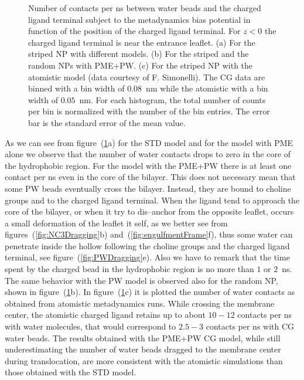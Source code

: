 \begin{figure}[ht!]
{	}%
	\caption{Number of contacts per ns between water beads and the charged ligand terminal subject to the metadynamics bias potential in function of the position of the charged ligand terminal. For $z<0$ the charged ligand terminal is near the entrance leaflet. (a) For the striped \acs{NP} with different models. (b) For the striped and the random \acs{NP}s with \acs{PME}+\acs{PW}. (c) For the striped \acs{NP} with the atomistic model (data courtesy of F. Simonelli). The \ac{CG} data are binned with a bin width of $0.08$~nm while the atomistic with a bin width of $0.05$~nm. For each histogram, the total number of counts per bin is normalized with the number of the bin entries. The error bar is the standard error of the mean value.}%
	\label{fig:WContact}
\end{figure}

As we can see from figure~(\ref{fig:WContact}a) for the \ac{STD} \martini{} model and for the model with \ac{PME} 
alone we observe that the number of water contacts drops to zero in the core of the hydrophobic region. For the 
model with the \ac{PME}+\ac{PW} there is at least one contact per ns even in the core of the bilayer. This does 
not necessary mean that some \ac{PW} beads eventually cross the bilayer. Instead, they are bound to choline groups 
and to the charged ligand terminal. When the ligand tend to approach the core of the bilayer, or when it try to 
dis--anchor from the opposite leaflet, occurs a small deformation of the leaflet it self, as we better see from 
figures~(\ref{fig:NC3Dragging}b) and~(\ref{fig:engulfmentFrame}f), thus some water can penetrate inside the hollow 
following the choline groups and the charged ligand terminal, see figure~(\ref{fig:PWDragging}e). Also we have to 
remark that the time spent by the charged bead in the hydrophobic region is no more than $1$ or $2$~ns. The same 
behavior with the \ac{PW} model is observed also for the random \ac{NP}, shown in figure~(\ref{fig:WContact}b). In 
figure~(\ref{fig:WContact}c) it is plotted the number of water contacts as obtained from atomistic metadynamics 
runs. While crossing the membrane center, the atomistic charged ligand retains up to about $10-12$ contacts per ns 
with water molecules, that would correspond to $2.5-3$ contacts per ns with \martini{} \ac{CG} water beads. The 
results obtained with the \ac{PME}$+$\ac{PW} \ac{CG} model, while still underestimating the number of water beads 
dragged to the membrane center during translocation, are more consistent with the atomistic simulations than those 
obtained with the \ac{STD} \martini{} model.

